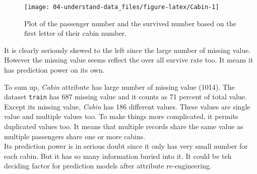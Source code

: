 \documentclass[
]{book}
\newenvironment{Shaded}{\begin{snugshade}}{\end{snugshade}}
\newcommand{\CommentTok}[1]{\textcolor[rgb]{0.56,0.35,0.01}{\textit{#1}}}
\newcommand{\DataTypeTok}[1]{\textcolor[rgb]{0.13,0.29,0.53}{#1}}
\newcommand{\DecValTok}[1]{\textcolor[rgb]{0.00,0.00,0.81}{#1}}
\newcommand{\KeywordTok}[1]{\textcolor[rgb]{0.13,0.29,0.53}{\textbf{#1}}}
\newcommand{\NormalTok}[1]{#1}
\newcommand{\OperatorTok}[1]{\textcolor[rgb]{0.81,0.36,0.00}{\textbf{#1}}}
\newcommand{\StringTok}[1]{\textcolor[rgb]{0.31,0.60,0.02}{#1}}
\begin{document}
\begin{Shaded}
\end{Shaded}

\begin{figure}

{\centering \texttt{[image: 04-understand-data\_files/figure-latex/Cabin-1]} 

}

\caption{Plot of the passenger number and  the survived number based on the first letter of their cabin number.}\label{fig:Cabin}
\end{figure}

It is clearly seriously skewed to the left since the large number of missing value. However the missing value seems reflect the over all survive rate too. It means it has prediction power on its own.

To sum up, \emph{Cabin} attribute has large number of missing value (1014). The dataset \texttt{train} has 687 missing value and it counts as 71 percent of total value. Except its missing value, \emph{Cabin} has 186 different values. These values are single value and multiple values too. To make things more complicated, it permits duplicated values too. It means that multiple records share the same value as multiple passengers share one or more cabins.\\
Its prediction power is in serious doubt since it only has very small number for each cabin. But it has so many information buried into it. It could be teh deciding factor for prediction models after attribute re-engineering.
\end{document}
